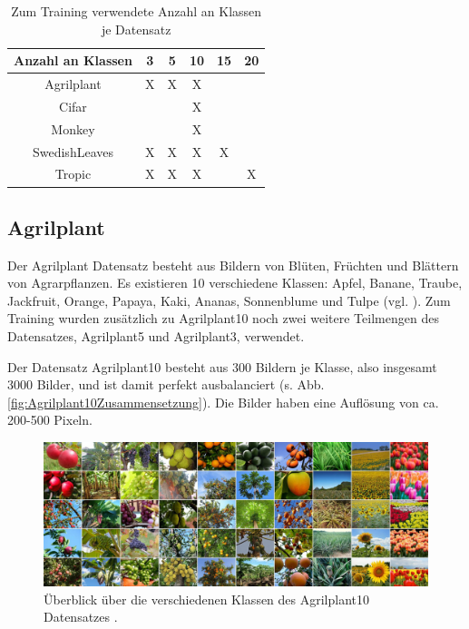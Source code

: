 \begin{table}
\centering
\begin{tabular}{|c|c|c|c|c|c|}
\hline 
Anzahl an Klassen & 3 & 5 & 10 & 15 & 20 \\ 
\hline 
Agrilplant & X & X & X &  &  \\ 
Cifar &  &  & X &  &  \\ 
Monkey &  &  & X &  &  \\ 
SwedishLeaves & X & X & X & X &  \\ 
Tropic & X & X & X & & X \\ 
\hline 
\end{tabular} 
\caption{Zum Training verwendete Anzahl an Klassen je Datensatz}
\label{fig:DatensatzKlassen}
\end{table}

\subsection{Agrilplant}
Der Agrilplant Datensatz \cite{pawaraWebsiteDatensaetze} besteht aus Bildern von Blüten, Früchten und Blättern von Agrarpflanzen.
Es existieren 10 verschiedene Klassen: Apfel, Banane, Traube, Jackfruit, Orange, Papaya, Kaki, Ananas, Sonnenblume und Tulpe (vgl. \cite{pawaraWebsiteDatensaetze}).
Zum Training wurden zusätzlich zu Agrilplant10 noch zwei weitere Teilmengen des Datensatzes, Agrilplant5 und Agrilplant3, verwendet.

Der Datensatz Agrilplant10 besteht aus 300 Bildern je Klasse, also insgesamt 3000 Bilder, und ist damit perfekt ausbalanciert (s. Abb. \ref{fig:Agrilplant10Zusammensetzung}).
Die Bilder haben eine Auflösung von ca. 200-500 Pixeln. \\

\begin{figure}[H]
\includegraphics[scale=0.2]{img/2_agrilplant-image.jpg}
\caption{Überblick über die verschiedenen Klassen des Agrilplant10 Datensatzes \cite{pawaraAgrilplant}.}
\label{fig:agrilplantUeberblick}
\end{figure}

